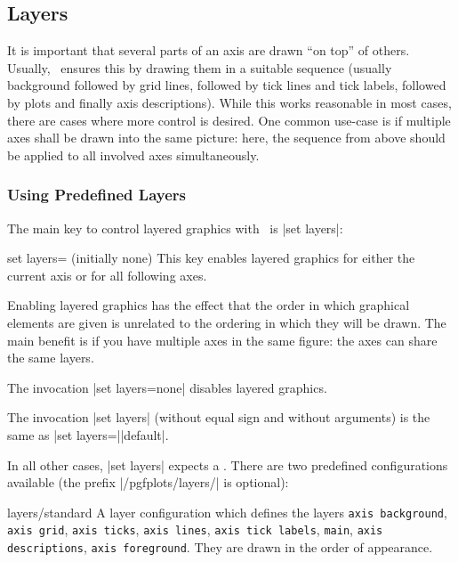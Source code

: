\subsection{Layers}
{
%

It is important that several parts of an axis are drawn ``on top'' of others. Usually, \PGFPlots\ ensures this by drawing them in a suitable sequence (usually background followed by grid lines, followed by tick lines and tick labels, followed by plots and finally axis descriptions). While this works reasonable in most cases, there are cases where more control is desired. One common use-case is if multiple axes shall be drawn into the same picture: here, the sequence from above should be applied to all involved axes simultaneously. 

\subsubsection{Using Predefined Layers}
The main key to control layered graphics with \PGFPlots\ is |set layers|:


\begin{pgfplotskey}{set layers= (initially none)}
   This key enables layered graphics for either the current axis or for all following axes. 

   Enabling layered graphics has the effect that the order in which graphical elements are given is unrelated to the ordering in which they will be drawn. The main benefit is if you have multiple axes in the same figure: the axes can share the same layers.

   The invocation |set layers=none| disables layered graphics.

   The invocation |set layers| (without equal sign and without arguments) is the same as |set layers=||default|.

   In all other cases, |set layers| expects a . There are two predefined configurations available (the prefix |/pgfplots/layers/| is optional):

   \begin{pgfplotskey}{layers/standard}
   	A layer configuration which defines the layers \texttt{axis background}, \texttt{axis grid}, \texttt{axis ticks}, \texttt{axis lines}, \texttt{axis tick labels}, \texttt{main}, \texttt{axis descriptions}, \texttt{axis foreground}. They are drawn in the order of appearance.
   \end{pgfplotskey}


\end{pgfplotskey}}
